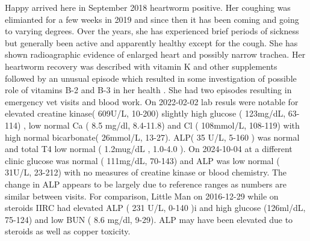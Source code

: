 Happy arrived here in September 2018 heartworm positive.
Her coughing was elimianted for a few weeks in 2019 and
since then it has been coming and going to varying degrees.
Over the years, she has experienced brief periods of sickness
but generally been active and apparently healthy except for the cough.
She has shown  radioagraphic evidence of enlarged heart and possibly narrow
trachea.   
Her heartworm recovery was described
with vitamin K and other supplements
\cite{mmarchywka-MJM-2019-001-.1li}
followed by an unusual episode which resulted in some
investigation of possible role of vitamins B-2 and B-3
in her health
\cite{marchywka-MJM-2022-009-0.50rg}
.
She had two episodes resulting in emergency vet visits
and blood work. On 2022-02-02 lab resuls were notable for
elevated creatine kinase( 609U/L, 10-200) 
slightly high glucose ( 123mg/dL, 63-114) , low normal Ca
( 8.5 mg/dl, 8.4-11.8)  and Cl ( 108mmol/L, 108-119)
with high normal bicarbonate( 26mmol/L, 13-27). 
ALP( 35 U/L, 5-160 ) was normal
and total T4 low normal ( 1.2mug/dL , 1.0-4.0 ). 
On 2024-10-04 at a different clinic glucose was normal
( 111mg/dL, 70-143) and ALP was low normal ( 31U/L, 23-212)
with no measures of creatine kinase or blood chemistry.
The change in ALP appears to be largely due to reference ranges
as numbers are similar between visits. 
For comparison, Little Man on 2016-12-29 while on steroids
IIRC had elevated ALP ( 231 U/L, 0-140 )i and high
glucose (126ml/dL, 75-124) and low BUN ( 8.6 mg/dl, 9-29).
ALP may have been elevated due to steroids as well as copper
toxicity. 


